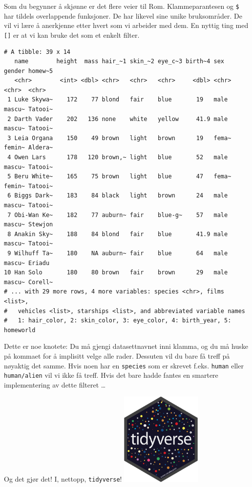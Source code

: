 \documentclass[
  letterpaper,
  DIV=11,
  numbers=noendperiod]{scrreprt}
\newenvironment{Shaded}{\begin{snugshade}}{\end{snugshade}}
\newcommand{\CommentTok}[1]{\textcolor[rgb]{0.37,0.37,0.37}{#1}}
\newcommand{\NormalTok}[1]{\textcolor[rgb]{0.00,0.23,0.31}{#1}}
\newcommand{\SpecialCharTok}[1]{\textcolor[rgb]{0.37,0.37,0.37}{#1}}
\newcommand{\StringTok}[1]{\textcolor[rgb]{0.13,0.47,0.30}{#1}}
\begin{document}
Som du begynner å skjønne er det flere veier til Rom. Klammeparantesen
og \texttt{\$} har tildels overlappende funksjoner. De har likevel sine
unike bruksområder. De vil vi lære å anerkjenne etter hvert som vi
arbeider med dem. En nyttig ting med \texttt{{[}{]}} er at vi kan bruke
det som et enkelt filter.

\begin{Shaded}
\end{Shaded}

\begin{verbatim}
# A tibble: 39 x 14
   name        height  mass hair_~1 skin_~2 eye_c~3 birth~4 sex   gender homew~5
   <chr>        <int> <dbl> <chr>   <chr>   <chr>     <dbl> <chr> <chr>  <chr>  
 1 Luke Skywa~    172    77 blond   fair    blue       19   male  mascu~ Tatooi~
 2 Darth Vader    202   136 none    white   yellow     41.9 male  mascu~ Tatooi~
 3 Leia Organa    150    49 brown   light   brown      19   fema~ femin~ Aldera~
 4 Owen Lars      178   120 brown,~ light   blue       52   male  mascu~ Tatooi~
 5 Beru White~    165    75 brown   light   blue       47   fema~ femin~ Tatooi~
 6 Biggs Dark~    183    84 black   light   brown      24   male  mascu~ Tatooi~
 7 Obi-Wan Ke~    182    77 auburn~ fair    blue-g~    57   male  mascu~ Stewjon
 8 Anakin Sky~    188    84 blond   fair    blue       41.9 male  mascu~ Tatooi~
 9 Wilhuff Ta~    180    NA auburn~ fair    blue       64   male  mascu~ Eriadu 
10 Han Solo       180    80 brown   fair    brown      29   male  mascu~ Corell~
# ... with 29 more rows, 4 more variables: species <chr>, films <list>,
#   vehicles <list>, starships <list>, and abbreviated variable names
#   1: hair_color, 2: skin_color, 3: eye_color, 4: birth_year, 5: homeworld
\end{verbatim}

Dette er noe knotete: Du må gjengi datasettnavnet inni klamma, og du må
huske på kommaet for å implisitt velge alle rader. Dessuten vil du bare
få treff på nøyaktig det samme. Hvis noen har en \texttt{species} som er
skrevet f.eks. \texttt{human} eller \texttt{human/alien} vil vi ikke få
treff. Hvis det bare hadde fantes en smartere implementering av dette
filteret \ldots{}

Og det gjør det! I, nettopp, \texttt{tidyverse}!
\includegraphics[width=0.3\textwidth,height=\textheight]{./img/tidyverse-logo.png}
\end{document}
